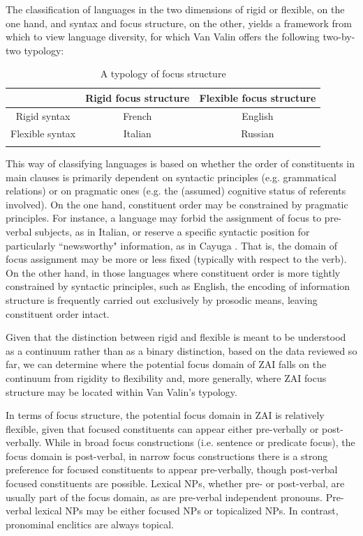 The classification of languages in the two dimensions of rigid or flexible, on the one hand, and syntax and focus structure, on the other, yields a framework from which to view language diversity, for which Van Valin offers the following two-by-two typology:
\begin{table}

\caption{{A typology of focus structure \citep{vanvalin1999}}}
\begin{tabular}{c  c  c  }
\lsptoprule
& Rigid focus structure & Flexible focus structure  \\

\midrule
Rigid syntax & French &  English \\

Flexible syntax & Italian & Russian \\

\lspbottomrule
\end{tabular} 
\end{table}
This way of classifying languages is based on whether the order of constituents in main clauses is primarily dependent on syntactic principles (e.g. grammatical relations) or on pragmatic ones (e.g. the (assumed) cognitive status of referents involved). On the one hand, constituent order may be constrained by pragmatic principles. For instance, a language may forbid the assignment of focus to pre-verbal subjects, as in Italian, or reserve a specific syntactic position for particularly ``newsworthy" information, as in Cayuga \citep{mithun1992}. That is, the domain of focus assignment may be more or less fixed (typically with respect to the verb). On the other hand, in those languages where constituent order is more tightly constrained by syntactic principles, such as English, the encoding of information structure is frequently carried out exclusively by prosodic means, leaving constituent order intact.

Given that the distinction between rigid and flexible is meant to be understood as a continuum rather than as a binary distinction, based on the data reviewed so far, we can determine where the potential focus domain of ZAI falls on the continuum from rigidity to flexibility and, more generally, where ZAI focus structure may be located within Van Valin's typology.

In terms of focus structure, the potential focus domain in ZAI is relatively flexible, given that focused constituents can appear either pre-verbally or post-verbally. While in broad focus constructions (i.e. sentence or predicate focus), the focus domain is post-verbal, in narrow focus constructions there is a strong preference for focused constituents to appear pre-verbally, though post-verbal focused constituents are possible. Lexical NPs, whether pre- or post-verbal, are usually part of the focus domain, as are pre-verbal independent pronouns. Pre-verbal lexical NPs may be either focused NPs or topicalized NPs. In contrast, pronominal enclitics are always topical. 

